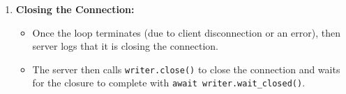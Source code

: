 \documentclass{exam}
\begin{document}
\begin{enumerate}
    \item \textbf{Closing the Connection:}
    \begin{itemize}
        \item Once the loop terminates (due to client disconnection or an error), then server logs that it is closing the connection.
        \item The server then calls \texttt{writer.close()} to close the connection and waits for the closure to complete with \texttt{await writer.wait\_closed()}.
    \end{itemize}
\end{enumerate}
\end{document}
